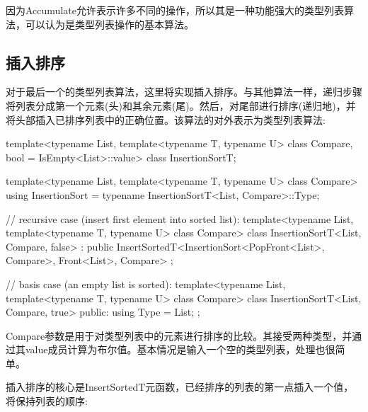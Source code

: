 因为Accumulate允许表示许多不同的操作，所以其是一种功能强大的类型列表算法，可以认为是类型列表操作的基本算法。

\subsection{插入排序}

对于最后一个的类型列表算法，这里将实现插入排序。与其他算法一样，递归步骤将列表分成第一个元素(头)和其余元素(尾)。然后，对尾部进行排序(递归地)，并将头部插入已排序列表中的正确位置。该算法的对外表示为类型列表算法:

\begin{cpp}
template<typename List,
		template<typename T, typename U> class Compare,
		bool = IsEmpty<List>::value>
class InsertionSortT;

template<typename List,
		template<typename T, typename U> class Compare>
using InsertionSort = typename InsertionSortT<List, Compare>::Type;

// recursive case (insert first element into sorted list):
template<typename List,
		template<typename T, typename U> class Compare>
class InsertionSortT<List, Compare, false>
: public InsertSortedT<InsertionSort<PopFront<List>, Compare>,
						Front<List>, Compare>
{
};

// basis case (an empty list is sorted):
template<typename List,
		template<typename T, typename U> class Compare>
class InsertionSortT<List, Compare, true>
{
	public:
	using Type = List;
};
\end{cpp}

Compare参数是用于对类型列表中的元素进行排序的比较。其接受两种类型，并通过其value成员计算为布尔值。基本情况是输入一个空的类型列表，处理也很简单。

插入排序的核心是InsertSortedT元函数，已经排序的列表的第一点插入一个值，将保持列表的顺序:

